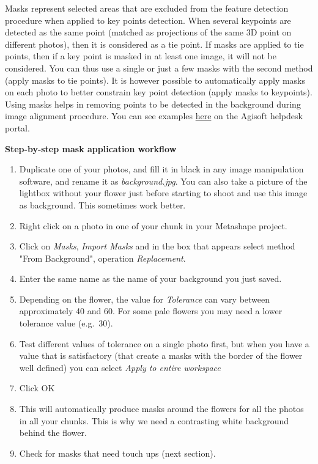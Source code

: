 \documentclass[
]{book}
\begin{document}
Masks represent selected areas that are excluded from the feature
detection procedure when applied to key points detection. When several
keypoints are detected as the same point (matched as projections of the
same 3D point on different photos), then it is considered as a tie
point. If masks are applied to tie points, then if a key point is masked
in at least one image, it will not be considered. You can thus use a
single or just a few masks with the second method (apply masks to tie
points). It is however possible to automatically apply masks on each
photo to better constrain key point detection (apply masks to
keypoints). Using masks helps in removing points to be detected in the
background during image alignment procedure. You can see examples
\href{https://agisoft.freshdesk.com/support/solutions/articles/31000158967-aligning-turntable-photos-with-background-suppression-from-single-mask-in-agisoft-metashape}{here}
on the Agisoft helpdesk portal.

\textbf{Step-by-step mask application workflow}

\begin{enumerate}
\def\labelenumi{\arabic{enumi}.}
\item
  Duplicate one of your photos, and fill it in black in any image
  manipulation software, and rename it as \emph{background.jpg}. You can
  also take a picture of the lightbox without your flower just before
  starting to shoot and use this image as background. This sometimes
  work better.
\item
  Right click on a photo in one of your chunk in your Metashape
  project.
\item
  Click on \emph{Masks}, \emph{Import Masks} and in the box that appears select
  method "From Background", operation \emph{Replacement}.
\item
  Enter the same name as the name of your background you just saved.
\item
  Depending on the flower, the value for \emph{Tolerance} can vary between
  approximately 40 and 60. For some pale flowers you may need a lower
  tolerance value (e.g.~30).
\item
  Test different values of tolerance on a single photo first, but when
  you have a value that is satisfactory (that create a masks with the
  border of the flower well defined) you can select \emph{Apply to entire
  workspace}
\item
  Click OK
\item
  This will automatically produce masks around the flowers for all the
  photos in all your chunks. This is why we need a contrasting white
  background behind the flower.
\item
  Check for masks that need touch ups (next section).
\end{enumerate}
\end{document}
